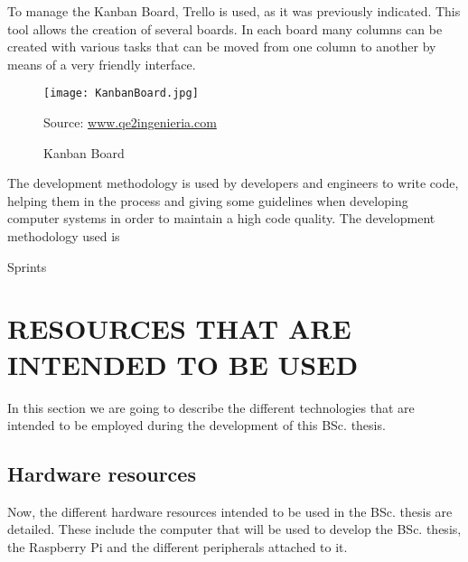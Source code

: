 \documentclass{pre-tfg}
\begin{document}
To manage the Kanban Board, Trello is used, as it was previously indicated. This tool allows the creation of several boards. In each board many columns can be created with various tasks that can be moved from one column to another by means of a very friendly interface.

\begin{figure}[!h]
	\begin{center}
		\texttt{[image: KanbanBoard.jpg]}
		\caption{Kanban Board}
		\label{fig:5-KanbanBoard}{Source: \url{www.qe2ingenieria.com}}
	\end{center}
\end{figure}

The development methodology is used by developers and engineers to write code, helping them in the process and giving some guidelines when developing computer systems in order to maintain a high code quality. The development methodology used is 





\begin{table}[!h]
	\centering
	{\small
		
	}
	\caption{Sprints}
	\label{tab:Sprints}
\end{table}



\section{RESOURCES THAT ARE INTENDED TO BE USED}

In this section we are going to describe the different technologies that are intended to be employed during the development of this BSc. thesis.

\subsection{Hardware resources}
Now, the different hardware resources intended to be used in the BSc. thesis are detailed. These include the computer that will be used to develop the BSc. thesis, the Raspberry Pi and the different peripherals attached to it.
\end{document}
